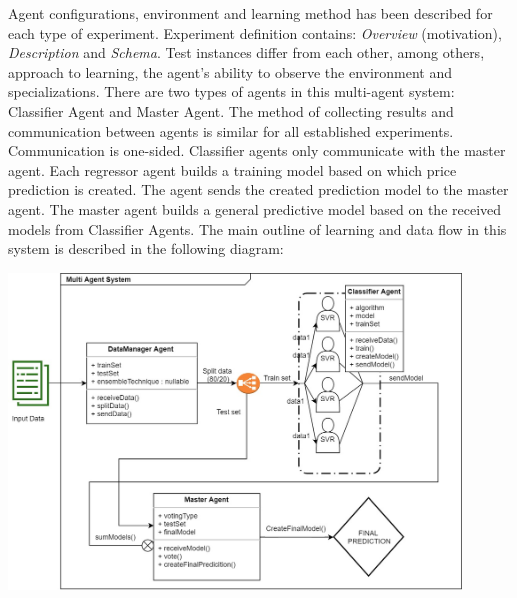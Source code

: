 \quad Agent configurations, environment and learning method has been described for each type of experiment. Experiment definition contains: \textit{Overview} (motivation), \textit{Description} and \textit{Schema}. Test instances differ from each other, among others, approach to learning, the agent's ability to observe the environment and specializations. There are two types of agents in this multi-agent system: Classifier Agent and Master Agent. The method of collecting results and communication between agents is similar for all established experiments. Communication is one-sided. Classifier agents only communicate with the master agent. Each regressor agent builds a training model based on which price prediction is created. The agent sends the created prediction model to the master agent. The master agent builds a general predictive model based on the received models from Classifier Agents.
\newline 
\quad The main outline of learning and data flow in this  system is described in the following diagram:
\newline
\begin{center}
	\includegraphics[width=0.9\textwidth, keepaspectratio]{diagrams/experiment1_schema.jpg}
	\center
	\label{fig:dataFlow}
\end{center}


